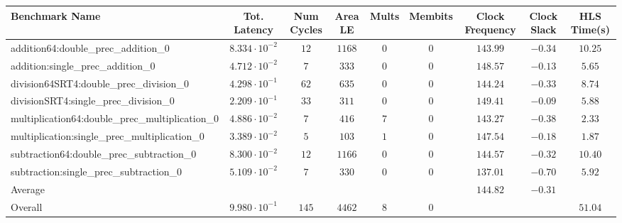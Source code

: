 \begin{tabular}{|l|c|c|c|c|c|c|c|c|}
\hline
Benchmark Name                                   & Tot. Latency            & Num Cycles & Area LE  & Mults & Membits & Clock Frequency & Clock Slack & HLS Time(s) \\
\hline
addition64:double\_prec\_addition\_0             & $ 8.334 \cdot 10^{-2} $ & $ 12     $ & $ 1168 $ & $ 0 $ & $ 0   $ & $ 143.99      $ & $ -0.34   $ & $ 10.25   $ \\
addition:single\_prec\_addition\_0               & $ 4.712 \cdot 10^{-2} $ & $ 7      $ & $ 333  $ & $ 0 $ & $ 0   $ & $ 148.57      $ & $ -0.13   $ & $ 5.65    $ \\
division64SRT4:double\_prec\_division\_0         & $ 4.298 \cdot 10^{-1} $ & $ 62     $ & $ 635  $ & $ 0 $ & $ 0   $ & $ 144.24      $ & $ -0.33   $ & $ 8.74    $ \\
divisionSRT4:single\_prec\_division\_0           & $ 2.209 \cdot 10^{-1} $ & $ 33     $ & $ 311  $ & $ 0 $ & $ 0   $ & $ 149.41      $ & $ -0.09   $ & $ 5.88    $ \\
multiplication64:double\_prec\_multiplication\_0 & $ 4.886 \cdot 10^{-2} $ & $ 7      $ & $ 416  $ & $ 7 $ & $ 0   $ & $ 143.27      $ & $ -0.38   $ & $ 2.33    $ \\
multiplication:single\_prec\_multiplication\_0   & $ 3.389 \cdot 10^{-2} $ & $ 5      $ & $ 103  $ & $ 1 $ & $ 0   $ & $ 147.54      $ & $ -0.18   $ & $ 1.87    $ \\
subtraction64:double\_prec\_subtraction\_0       & $ 8.300 \cdot 10^{-2} $ & $ 12     $ & $ 1166 $ & $ 0 $ & $ 0   $ & $ 144.57      $ & $ -0.32   $ & $ 10.40   $ \\
subtraction:single\_prec\_subtraction\_0         & $ 5.109 \cdot 10^{-2} $ & $ 7      $ & $ 330  $ & $ 0 $ & $ 0   $ & $ 137.01      $ & $ -0.70   $ & $ 5.92    $ \\
\hline
Average                                          & $                     $ & $        $ & $      $ & $   $ & $     $ & $ 144.82      $ & $ -0.31   $ & $         $ \\
\hline
Overall                                          & $ 9.980 \cdot 10^{-1} $ & $ 145    $ & $ 4462 $ & $ 8 $ & $ 0   $ & $             $ & $         $ & $ 51.04   $ \\
\hline
\end{tabular}
